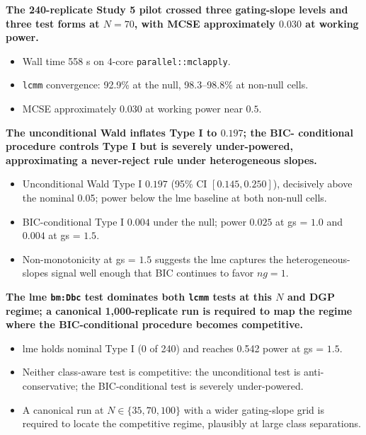 \documentclass[
  11pt,
]{article}
\begin{document}
\textbf{The 240-replicate Study 5 pilot crossed three gating-slope
levels and three test forms at $N = 70$, with MCSE approximately
$0.030$ at working power.}

\begin{itemize}\setlength{\itemsep}{2pt}\setlength{\parskip}{0pt}
\item Wall time 558 s on 4-core \texttt{parallel::mclapply}.
\item \texttt{lcmm} convergence: 92.9\% at the null, 98.3--98.8\% at
  non-null cells.
\item MCSE approximately $0.030$ at working power near $0.5$.
\end{itemize}

\textbf{The unconditional Wald inflates Type I to $0.197$; the BIC-
conditional procedure controls Type I but is severely under-powered,
approximating a never-reject rule under heterogeneous slopes.}

\begin{itemize}\setlength{\itemsep}{2pt}\setlength{\parskip}{0pt}
\item Unconditional Wald Type I $0.197$ (95\% CI $[0.145, 0.250]$),
  decisively above the nominal 0.05; power below the lme baseline
  at both non-null cells.
\item BIC-conditional Type I $0.004$ under the null; power $0.025$
  at gs = $1.0$ and $0.004$ at gs = $1.5$.
\item Non-monotonicity at gs = $1.5$ suggests the lme captures the
  heterogeneous-slopes signal well enough that BIC continues to
  favor $ng=1$.
\end{itemize}

\textbf{The lme \texttt{bm:Dbc} test dominates both \texttt{lcmm}
tests at this $N$ and DGP regime; a canonical 1,000-replicate run is
required to map the regime where the BIC-conditional procedure becomes
competitive.}

\begin{itemize}\setlength{\itemsep}{2pt}\setlength{\parskip}{0pt}
\item lme holds nominal Type I (0 of 240) and reaches 0.542 power
  at gs = $1.5$.
\item Neither class-aware test is competitive: the unconditional
  test is anti-conservative; the BIC-conditional test is severely
  under-powered.
\item A canonical run at $N \in \{35, 70, 100\}$ with a wider
  gating-slope grid is required to locate the competitive regime,
  plausibly at large class separations.
\end{itemize}
\end{document}
